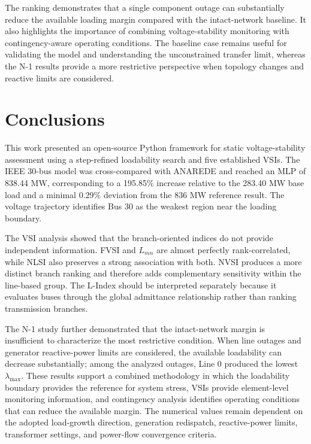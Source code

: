 \documentclass[conference]{IEEEtran}
\begin{document}
The ranking demonstrates that a single component outage can substantially reduce the available loading margin compared with the intact-network baseline. It also highlights the importance of combining voltage-stability monitoring with contingency-aware operating conditions. The baseline case remains useful for validating the model and understanding the unconstrained transfer limit, whereas the N-1 results provide a more restrictive perspective when topology changes and reactive limits are considered.



\section{Conclusions}
\label{sec:conclusions}

This work presented an open-source Python framework for static voltage-stability assessment using a step-refined loadability search and five established VSIs. The IEEE 30-bus model was cross-compared with ANAREDE and reached an MLP of 838.44 MW, corresponding to a 195.85\% increase relative to the 283.40 MW base load and a minimal 0.29\% deviation from the 836 MW reference result. The voltage trajectory identifies Bus 30 as the weakest region near the loading boundary.

The VSI analysis showed that the branch-oriented indices do not provide independent information. FVSI and $L_{mn}$ are almost perfectly rank-correlated, while NLSI also preserves a strong association with both. NVSI produces a more distinct branch ranking and therefore adds complementary sensitivity within the line-based group. The L-Index should be interpreted separately because it evaluates buses through the global admittance relationship rather than ranking transmission branches.

The N-1 study further demonstrated that the intact-network margin is insufficient to characterize the most restrictive condition. When line outages and generator reactive-power limits are considered, the available loadability can decrease substantially; among the analyzed outages, Line 0 produced the lowest $\lambda_{\max}$. These results support a combined methodology in which the loadability boundary provides the reference for system stress, VSIs provide element-level monitoring information, and contingency analysis identifies operating conditions that can reduce the available margin. The numerical values remain dependent on the adopted load-growth direction, generation redispatch, reactive-power limits, transformer settings, and power-flow convergence criteria.



\end{document}

